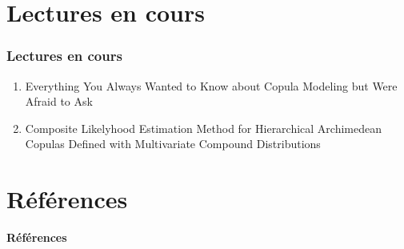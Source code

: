 \documentclass[11pt]{beamer}
\begin{document}
\section{Lectures en cours}
\begin{frame}
	\frametitle{Lectures en cours}
	
	\begin{enumerate}
		\item Everything You Always Wanted to Know about Copula Modeling but Were Afraid to Ask \cite{Everything}
		\newline
		\item Composite Likelyhood Estimation Method for Hierarchical Archimedean Copulas Defined with Multivariate Compound Distributions \cite{LikelyhoodEstimation}
	\end{enumerate}
\end{frame}


\section{Références}
\begin{frame}[allowframebreaks]{\textbf{Références}}
	
	
\end{frame}
\end{document}
